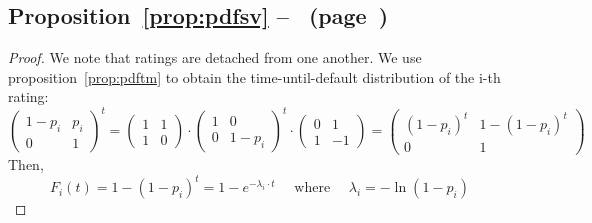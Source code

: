 \documentclass[11pt,fleqn]{book} %
\begin{document}
\subsection{Proposition~\ref{prop:pdfsv} --~ (page~\pageref{prop:pdfsv})}
\begin{proof}
	We note that ratings are detached from one another. We use 
	proposition~\ref{prop:pdftm} to obtain the time-until-default distribution 
	of the i-th rating:
	\small
	\begin{displaymath}
		\left(
		\begin{array}{cc}
			1-p_i & p_i \\
			0 & 1
		\end{array}
		\right) ^ t 
		= 
		\left(
		\begin{array}{cc}
			1 & 1 \\
			1 & 0
		\end{array}
		\right) 
		\cdot
		\left(
		\begin{array}{cc}
			1 & 0 \\
			0 & 1-p_i
		\end{array}
		\right) ^t 
		\cdot
		\left(
		\begin{array}{cc}
			0 & 1 \\
			1 & -1
		\end{array}
		\right)
		=
		\left(
		\begin{array}{cc}
			(1-p_i)^t & 1-(1-p_i)^t \\
			0 & 1
		\end{array}
		\right)
	\end{displaymath}
	Then,
	\begin{displaymath}
		F_i(t) = 1-(1-p_i)^t = 1 - e^{-\lambda_i \cdot t} \quad \text{ where } \quad \lambda_i = -\ln(1-p_i)
	\end{displaymath}
\end{proof}
\end{document}
